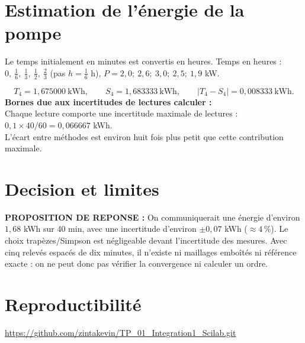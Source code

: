 \documentclass[12pt, a4paper]{article}
\begin{document}
\section{Estimation de l'énergie de la pompe}
Le temps initialement en minutes est convertis en heures.
Temps en heures : $0,\ \tfrac16,\ \tfrac13,\ \tfrac12,\ \tfrac23$ (pas $h=\tfrac16$ h), $P=2{,}0;\ 2{,}6;\ 3{,}0;\ 2{,}5;\ 1{,}9$ kW.

\[  
T_4 = 1{,}675000\ \text{kWh},\qquad 
S_4 = 1{,}683333\ \text{kWh},\qquad
|T_4-S_4| = 0{,}008333\ \text{kWh}.
\]
\noindent\textbf{Bornes due aux  incertitudes de lectures calculer :} \\Chaque lecture comporte une incertitude maximale  de lectures : $0{,}1\times 40/60 = 0{,}066667$ kWh. \\
L'écart entre méthodes est environ huit fois plus petit que cette contribution maximale.

\medskip
\section{Decision et limites}
\noindent\textbf{PROPOSITION DE REPONSE :} On communiquerait une énergie d'environ $1{,}68$ kWh sur 40 min, avec une incertitude d'environ $\pm 0{,}07$ kWh ($\approx 4\,\%$). Le choix trapèzes/Simpson est négligeable devant l'incertitude des mesures. Avec cinq relevés espacés de dix minutes, il n'existe ni maillages emboîtés ni référence exacte : on ne peut donc pas vérifier la convergence ni calculer un ordre.

\section{Reproductibilité}
\url{https://github.com/zintakevin/TP_01_Integration1_Scilab.git}

\end{document}
